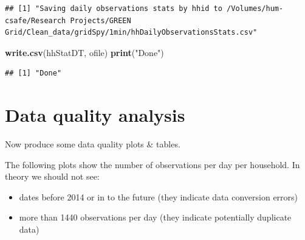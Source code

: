 \documentclass[]{article}
\newenvironment{Shaded}{\begin{snugshade}}{\end{snugshade}}
\newcommand{\KeywordTok}[1]{\textcolor[rgb]{0.13,0.29,0.53}{\textbf{#1}}}
\newcommand{\StringTok}[1]{\textcolor[rgb]{0.31,0.60,0.02}{#1}}
\newcommand{\NormalTok}[1]{#1}
\providecommand{\tightlist}{%
  \setlength{\itemsep}{0pt}\setlength{\parskip}{0pt}}
\begin{document}
\begin{verbatim}
## [1] "Saving daily observations stats by hhid to /Volumes/hum-csafe/Research Projects/GREEN Grid/Clean_data/gridSpy/1min/hhDailyObservationsStats.csv"
\end{verbatim}

\begin{Shaded}
\begin{Highlighting}[]
\KeywordTok{write.csv}\NormalTok{(hhStatDT, ofile)}
\KeywordTok{print}\NormalTok{(}\StringTok{"Done"}\NormalTok{)}
\end{Highlighting}
\end{Shaded}

\begin{verbatim}
## [1] "Done"
\end{verbatim}

\section{Data quality analysis}\label{data-quality-analysis}

Now produce some data quality plots \& tables.

The following plots show the number of observations per day per
household. In theory we should not see:

\begin{itemize}
\tightlist
\item
  dates before 2014 or in to the future (they indicate data conversion
  errors)
\item
  more than 1440 observations per day (they indicate potentially
  duplicate data)
\end{itemize}
\end{document}
